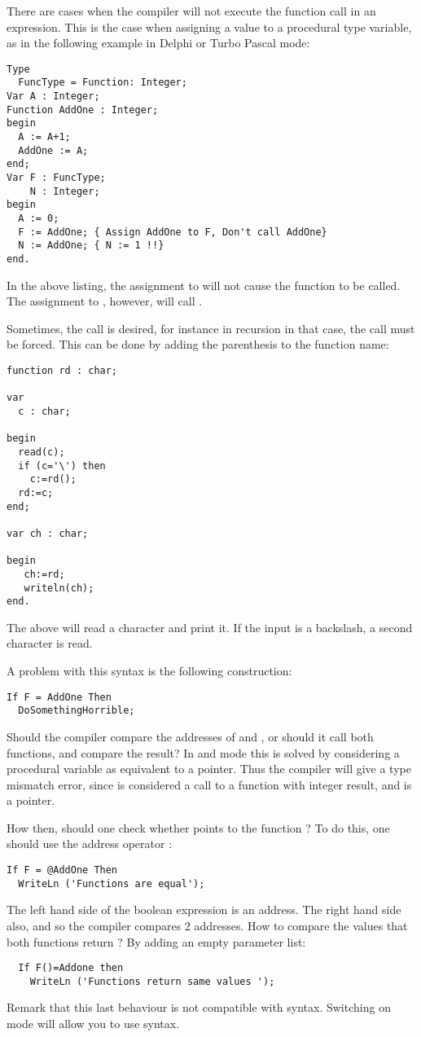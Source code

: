 There are cases when the compiler will not execute the function call in an
expression. This is the case when assigning a value to a procedural
type variable, as in the following example in Delphi or Turbo Pascal mode:
\begin{verbatim}
Type
  FuncType = Function: Integer;
Var A : Integer;
Function AddOne : Integer;
begin
  A := A+1;
  AddOne := A;
end;
Var F : FuncType;
    N : Integer;
begin
  A := 0;
  F := AddOne; { Assign AddOne to F, Don't call AddOne}
  N := AddOne; { N := 1 !!}
end.
\end{verbatim}
In the above listing, the assignment to  will not cause the function
 to be called. The assignment to , however, will call
. 

Sometimes, the call is desired, for instance in recursion
in that case, the call must be forced. This can be done by adding the
parenthesis to the function name:
\begin{verbatim}
function rd : char;

var 
  c : char;

begin
  read(c);
  if (c='\') then 
    c:=rd();
  rd:=c;
end;

var ch : char;

begin
   ch:=rd;
   writeln(ch);
end.
\end{verbatim}
The above will read a character and print it. If the input is a backslash, a
second character is read.

A problem with this syntax is the following construction:
\begin{verbatim}
If F = AddOne Then
  DoSomethingHorrible;
\end{verbatim}
Should the compiler compare the addresses of  and ,
or should it call both functions, and compare the result? In  and
 mode this is solved by considering a procedural variable as
equivalent to a pointer. Thus the compiler will give a type mismatch error,
since  is considered a call to a function with integer result,
and  is a pointer.

How then, should one check whether  points to the function
? To do this, one should use the address operator :
\begin{verbatim}
If F = @AddOne Then
  WriteLn ('Functions are equal');
\end{verbatim}
The left hand side of the boolean expression is an address. The right hand
side also, and so the compiler compares 2 addresses.
How to compare the values that both functions return ? By adding an empty
parameter list:
\begin{verbatim}
  If F()=Addone then
    WriteLn ('Functions return same values ');
\end{verbatim}
Remark that this last behaviour is not compatible with \delphi syntax. 
Switching on  mode will allow you to use \delphi syntax.

